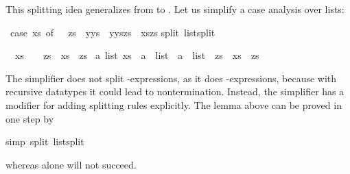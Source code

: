 \begin{isabellebody}
\begin{isamarkuptxt}
This splitting idea generalizes from  to .
Let us simplify a case analysis over lists:%
\end{isamarkuptxt}%
\isamarkuptrue%
%
\endisatagproof
{\isafoldproof}%
%
\isadelimproof
%
\endisadelimproof
{}\isamarkupfalse%
\ {\isachardoublequoteopen}{\isacharparenleft}case\ xs\ of\ {\isacharbrackleft}{\isacharbrackright}\ {\isasymRightarrow}\ zs\ {\isacharbar}\ y{\isacharhash}ys\ {\isasymRightarrow}\ y{\isacharhash}{\isacharparenleft}ys{\isacharat}zs{\isacharparenright}{\isacharparenright}\ {\isacharequal}\ xs{\isacharat}zs{\isachardoublequoteclose}\isanewline
%
\isadelimproof
%
\endisadelimproof
%
\isatagproof
{}\isamarkupfalse%
{\isacharparenleft}split\ list{\isachardot}split{\isacharparenright}%
\begin{isamarkuptxt}%
\begin{isabelle}%
\ {}{\isachardot}\ {\isacharparenleft}xs\ {\isacharequal}\ {\isacharbrackleft}{\isacharbrackright}\ {\isasymlongrightarrow}\ zs\ {\isacharequal}\ xs\ {\isacharat}\ zs{\isacharparenright}\ {\isasymand}\isanewline
{}a\ list{\isachardot}\ xs\ {\isacharequal}\ a\ {\isacharhash}\ list\ {\isasymlongrightarrow}\ a\ {\isacharhash}\ list\ {\isacharat}\ zs\ {\isacharequal}\ xs\ {\isacharat}\ zs{\isacharparenright}%
\end{isabelle}
The simplifier does not split
-expressions, as it does -expressions, 
because with recursive datatypes it could lead to nontermination.
Instead, the simplifier has a modifier
for adding splitting rules explicitly.  The
lemma above can be proved in one step by%
\end{isamarkuptxt}%
\isamarkuptrue%
%
\endisatagproof
{\isafoldproof}%
%
\isadelimproof
%
\endisadelimproof
%
\isadelimproof
%
\endisadelimproof
%
\isatagproof
{}\isamarkupfalse%
{\isacharparenleft}simp\ split{\isacharcolon}\ list{\isachardot}split{\isacharparenright}%
\endisatagproof
{\isafoldproof}%
%
\isadelimproof
%
\endisadelimproof
%
\begin{isamarkuptext}%
\noindent
whereas  alone will not succeed.


\end{isamarkuptext}
\end{isabellebody}
